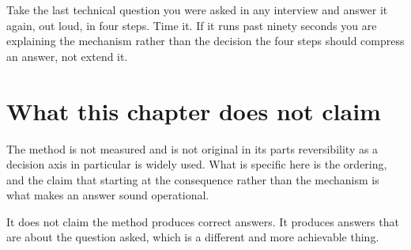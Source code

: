 
\begin{drill}
Take the last technical question you were asked in any interview and answer it
again, out loud, in four steps. Time it. If it runs past ninety seconds you are
explaining the mechanism rather than the decision \dash{} the four steps should
compress an answer, not extend it.
\end{drill}

\section*{What this chapter does not claim}

The method is not measured and is not original in its parts \dash{} reversibility
as a decision axis in particular is widely used. What is specific here is the
ordering, and the claim that starting at the consequence rather than the
mechanism is what makes an answer sound operational.

It does not claim the method produces correct answers. It produces answers that
are about the question asked, which is a different and more achievable thing.
